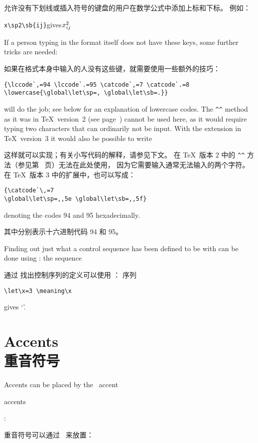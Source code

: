 允许没有下划线或插入符号的键盘的用户在数学公式中添加上标和下标。
例如：
\begin{disp}\verb>x\sp2\sb{ij}>\quad gives\quad $x\sp2\sb{ij}$\end{disp}
If a person typing in the format itself does not have
these keys, some further tricks are needed:\label{spsb:truc}

如果在格式本身中输入的人没有这些键，就需要使用一些额外的技巧：
\begin{verbatim}
{\lccode`,=94 \lccode`.=95 \catcode`,=7 \catcode`.=8
\lowercase{\global\let\sp=, \global\let\sb=.}}
\end{verbatim}
will do the job; see below for an explanation of lowercase codes.
The \verb>^^> method as it was in \TeX\ version~2
(see page~\pageref{hathat}) cannot be used here,
as it would require typing two characters that can ordinarily
not be input.
With the extension in \TeX\ version~3 it would also be possible
to write 

这样就可以实现；有关小写代码的解释，请参见下文。
在 \TeX\ 版本 2 中的 \verb>^^> 方法（参见第~\pageref{hathat} 页）无法在此处使用，
因为它需要输入通常无法输入的两个字符。
在 \TeX\ 版本 3 中的扩展中，也可以写成：
\begin{verbatim}
{\catcode`\,=7
\global\let\sp=,,5e \global\let\sb=,,5f}
\end{verbatim}
denoting the codes 94 and 95 hexadecimally.

其中分别表示十六进制代码 94 和 95。

Finding out just what a control sequence has been defined to be with
 can be done using :
the sequence 

通过  找出控制序列的定义可以使用 ：
序列
\begin{verbatim}
\let\x=3 \meaning\x
\end{verbatim}
gives
`'.\awp


\section{Accents\\重音符号}

Accents can be placed by the
~\cstoidx accent\par\term accents\par
\label{character}:

重音符号可以通过~ 来放置：


